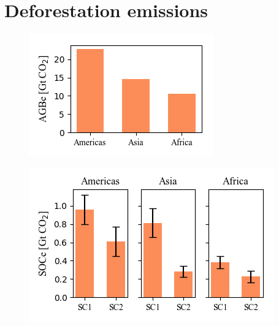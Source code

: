 \clearpage

	\section{Deforestation emissions}
	\label{sec:emissions}

		\begin{figure}[ht]
			\centering
			\includegraphics[scale=1]{img/agbe}
			\caption[Ecosystem service values]{}
			\label{fig:agbe}
		\end{figure}
		\begin{figure}[ht]
			\centering
			\includegraphics[scale=1]{img/soce}
			\caption[Ecosystem service values]{}
			\label{fig:soce}
		\end{figure}
		
